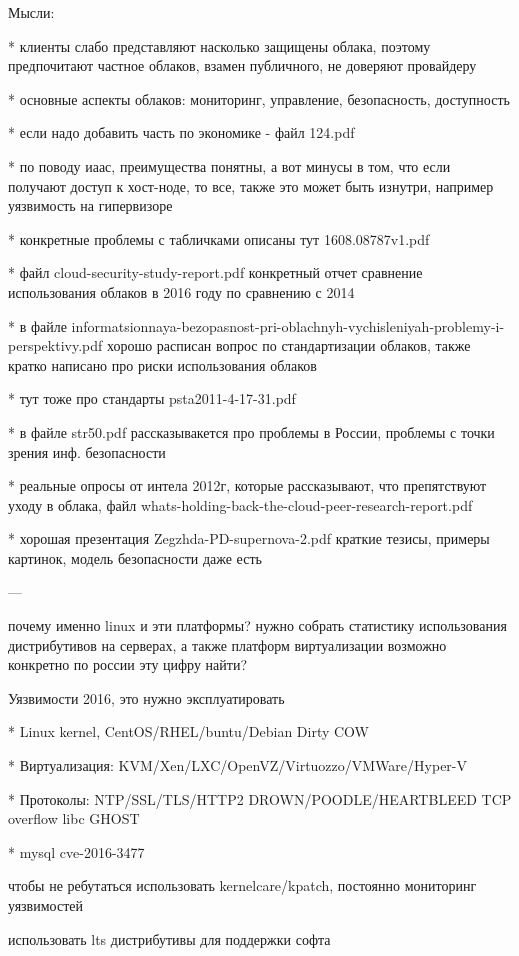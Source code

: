 Мысли:

* клиенты слабо представляют насколько защищены облака, поэтому предпочитают частное облаков, взамен публичного, не доверяют провайдеру

* основные аспекты облаков: мониторинг, управление, безопасность, доступность

* если надо добавить часть по экономике - файл 124.pdf

* по поводу иаас, преимущества понятны, а вот минусы в том, что если получают доступ к хост-ноде, то все, также это может быть изнутри, например уязвимость на гипервизоре

* конкретные проблемы с табличками описаны тут 1608.08787v1.pdf

* файл cloud-security-study-report.pdf конкретный отчет сравнение использования облаков в 2016 году по сравнению с 2014

* в файле informatsionnaya-bezopasnost-pri-oblachnyh-vychisleniyah-problemy-i-perspektivy.pdf хорошо расписан вопрос по стандартизации облаков, также кратко написано про риски использования облаков

* тут тоже про стандарты psta2011-4-17-31.pdf

* в файле str50.pdf рассказывакется про проблемы в России, проблемы с точки зрения инф. безопасности

* реальные опросы от интела 2012г, которые рассказывают, что препятствуют уходу в облака, файл whats-holding-back-the-cloud-peer-research-report.pdf

* хорошая презентация Zegzhda-PD-supernova-2.pdf краткие тезисы, примеры картинок, модель безопасности даже есть

---


почему именно linux и эти платформы?
нужно собрать статистику использования дистрибутивов на серверах, а также платформ виртуализации
возможно конкретно по россии эту цифру найти?

Уязвимости 2016, это нужно эксплуатировать

* Linux kernel, CentOS/RHEL/buntu/Debian Dirty COW

* Виртуализация: KVM/Xen/LXC/OpenVZ/Virtuozzo/VMWare/Hyper-V

* Протоколы: NTP/SSL/TLS/HTTP2 DROWN/POODLE/HEARTBLEED TCP overflow libc GHOST

* mysql cve-2016-3477

чтобы не ребутаться использовать kernelcare/kpatch, постоянно мониторинг уязвимостей

использовать lts дистрибутивы для поддержки софта

